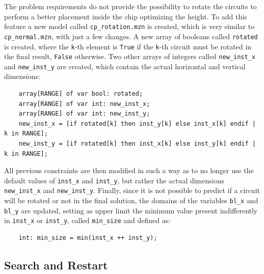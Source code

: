 \documentclass[a4paper, 12pt]{article}
\begin{document}
The problem requirements do not provide the possibility to rotate the circuits to perform a better placement inside the chip optimizing the height. To add this feature a new model called \verb|cp_rotation.mzn| is created, which is very similar to \verb|cp_normal.mzn|, with just a few changes. A new array of booleans called \verb|rotated| is created, where the \verb|k|-th element is \verb|True| if the \verb|k|-th circuit must be rotated in the final result, \verb|False| otherwise. Two other arrays of integers called \verb|new_inst_x| and \verb|new_inst_y| are created, which contain the actual horizontal and vertical dimensions:
\begin{verbatim}
    array[RANGE] of var bool: rotated;
    array[RANGE] of var int: new_inst_x;
    array[RANGE] of var int: new_inst_y;
    new_inst_x = [if rotated[k] then inst_y[k] else inst_x[k] endif | k in RANGE];
    new_inst_y = [if rotated[k] then inst_x[k] else inst_y[k] endif | k in RANGE];
\end{verbatim}

All previous constraints are then modified in such a way as to no longer use the default values of \verb|inst_x| and \verb|inst_y|, but rather the actual dimensions \verb|new_inst_x| and \verb|new_inst_y|. Finally, since it is not possible to predict if a circuit will be rotated or not in the final solution, the domains of the variables \verb|bl_x| and \verb|bl_y| are updated, setting as upper limit the minimum value present indifferently in \verb|inst_x| or \verb|inst_y|, called \verb|min_size| and defined as:
\begin{verbatim}
    int: min_size = min(inst_x ++ inst_y);
\end{verbatim}


\subsection{Search and Restart}
\end{document}
